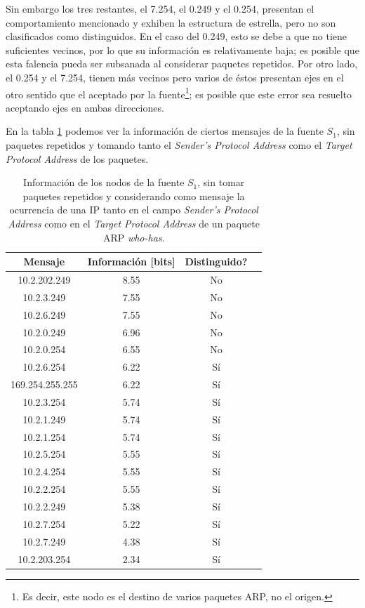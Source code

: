 \par Sin embargo los tres restantes, el 7.254, el 0.249 y el 0.254, presentan el comportamiento mencionado y exhiben la estructura de estrella, pero no son clasificados como distinguidos.
En el caso del 0.249, esto se debe a que no tiene suficientes vecinos, por lo que su información es relativamente baja; es posible que esta falencia pueda ser subsanada al considerar paquetes repetidos.
Por otro lado, el 0.254 y el 7.254, tienen más vecinos pero varios de éstos presentan ejes en el otro sentido que el aceptado por la fuente\footnote{Es decir, este nodo es el destino de varios paquetes ARP, no el origen.}; es posible que este error sea resuelto aceptando ejes en ambas direcciones.

\par En la tabla \ref{tab1A} podemos ver la información de ciertos mensajes de la fuente $S_1$, sin paquetes repetidos y tomando tanto el \textit{Sender's Protocol Address} como el \textit{Target Protocol Address} de los paquetes.

\begin{table}[t]
    \centering
    \begin{tabular}{ | c | c | c | l |}
        \hline
        Mensaje & Información [bits] & Distinguido?\\
\hline
10.2.202.249 & 8.55 & No \\
\hline
10.2.3.249 & 7.55 & No \\
\hline
10.2.6.249 & 7.55 & No \\
\hline
10.2.0.249 & 6.96 & No \\
\hline
10.2.0.254 & 6.55 & No \\
\hline
10.2.6.254 & 6.22 & Sí \\
\hline
169.254.255.255 & 6.22 & Sí \\
\hline
10.2.3.254 & 5.74 & Sí \\
\hline
10.2.1.249 & 5.74 & Sí \\
\hline
10.2.1.254 & 5.74 & Sí \\
\hline
10.2.5.254 & 5.55 & Sí \\
\hline
10.2.4.254 & 5.55 & Sí \\
\hline
10.2.2.254 & 5.55 & Sí \\
\hline
10.2.2.249 & 5.38 & Sí \\
\hline
10.2.7.254 & 5.22 & Sí \\
\hline
10.2.7.249 & 4.38 & Sí \\
\hline
10.2.203.254 & 2.34 & Sí \\
\hline
    \end{tabular} 
    \caption{Información de los nodos de la fuente $S_1$, sin tomar paquetes repetidos y considerando como mensaje la ocurrencia de una IP tanto en el campo \textit{Sender's Protocol Address} como en el \textit{Target Protocol Address} de un paquete ARP \textit{who-has}.}
    \label{tab1A}
\end{table} 

